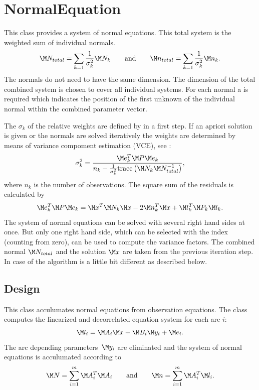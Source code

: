 \clearpage

\section{NormalEquation}\label{normalEquationType}
This class provides a system of normal equations.
This total system is the weighted sum of individual normals.
\begin{equation}
 \M N_{total} =  \sum_{k=1} \frac{1}{\sigma_k^2}\M N_k
 \qquad\text{and}\qquad
\M n_{total} = \sum_{k=1} \frac{1}{\sigma_k^2} \M n_k.
\end{equation}
The normals do not need to have the same dimension. The dimension
of the total combined system is chosen to cover all individual systems.
For each normal a  is required which indicates
the position of the first unknown of the individual normal within the
combined parameter vector.

The $\sigma_k$ of the relative weights are defined by 
in a first step. If an apriori solution  is
given or the normals are solved iteratively the weights are determined by means
of variance compoment estimation (VCE), see :
\begin{equation}
\sigma_k^2 =
\frac{\M e_k^T\M P\M e_k}
{n_k-\frac{1}{\sigma_k^2}\text{trace}\left(\M N_k\M N_{total}^{-1}\right)},
\end{equation}
where $n_k$ is the number of observations. The square sum of the residuals
is calculated by
\begin{equation}
\M e_k^T\M P\M e_k = \M x^T\M N_k\M x - 2\M n_k^T\M x + \M l_k^T\M P_k\M l_k.
\end{equation}
The system of normal equations can be solved with several right hand sides at once. But
only one right hand side, which can be selected with the index 
(counting from zero), can be used to compute the variance factors.
The combined normal $\M N_{total}$ and the solution $\M x$ are taken from the previous
iteration step. In case of  the algorithm
is a little bit different as described below.


\subsection{Design}\label{normalEquationType:design}
This class acculumates normal equations from observation equations.
The class  computes
the linearized and decorrelated equation system for each arc $i$:
\begin{equation}
\M l_i  = \M A_i \M x + \M B_i \M y_i + \M e_i.
\end{equation}
The arc depending parameters~$\M y_i$ are eliminated and the system of normal
equations is acculumated according to
\begin{equation}
 \M N = \sum_{i=1}^m \M A_i^T  \M A_i
 \qquad\text{and}\qquad
\M n = \sum_{i=1}^m \M A_i^T \M l_i.
\end{equation}


